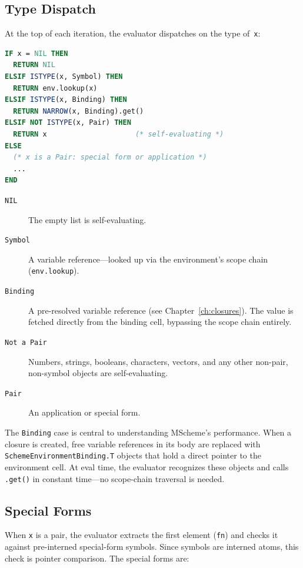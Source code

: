 \documentclass[12pt]{report}
\begin{document}
\subsection{Type Dispatch}

At the top of each iteration, the evaluator dispatches on the type
of~\texttt{x}:

\begin{lstlisting}[language=Modula3]
IF x = NIL THEN
  RETURN NIL
ELSIF ISTYPE(x, Symbol) THEN
  RETURN env.lookup(x)
ELSIF ISTYPE(x, Binding) THEN
  RETURN NARROW(x, Binding).get()
ELSIF NOT ISTYPE(x, Pair) THEN
  RETURN x                     (* self-evaluating *)
ELSE
  (* x is a Pair: special form or application *)
  ...
END
\end{lstlisting}

\begin{description}
\item[\texttt{NIL}] The empty list is self-evaluating.
\item[\texttt{Symbol}] A variable reference---looked up via the
  environment's scope chain (\texttt{env.lookup}).
\item[\texttt{Binding}] A pre-resolved variable reference (see
  Chapter~\ref{ch:closures}).  The value is fetched directly from the
  binding cell, bypassing the scope chain entirely.
\item[\texttt{Not a Pair}] Numbers, strings, booleans, characters,
  vectors, and any other non-pair, non-symbol objects are self-evaluating.
\item[\texttt{Pair}] An application or special form.
\end{description}

The \texttt{Binding} case is central to understanding MScheme's
performance.  When a closure is created, free variable references in its
body are replaced with \texttt{SchemeEnvironmentBinding.T} objects that
hold a direct pointer to the environment cell.  At eval time, the
evaluator recognizes these objects and calls \texttt{.get()} in constant
time---no scope-chain traversal is needed.

\subsection{Special Forms}

When \texttt{x} is a pair, the evaluator extracts the first element
(\texttt{fn}) and checks it against pre-interned special-form symbols.
Since symbols are interned atoms, this check is pointer comparison.
The special forms are:
\end{document}
